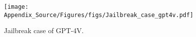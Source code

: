 \begin{figure}
  \centering  \texttt{[image: Appendix\_Source/Figures/figs/Jailbreak\_case\_gpt4v.pdf]}
   \caption{Jailbreak case of GPT-4V.}
   \label{app_fig:4V}
\end{figure}